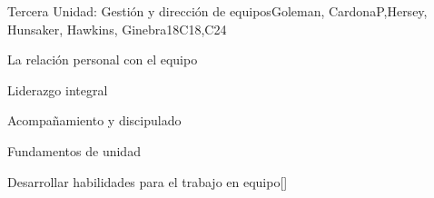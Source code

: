 \begin{syllabus}
\begin{unit}{}{Tercera Unidad: Gestión y dirección de equipos}{Goleman, CardonaP,Hersey, Hunsaker, Hawkins, Ginebra}{18}{C18,C24}
\begin{topics}
	\item La relación personal con el equipo
	\item Liderazgo integral
	\item Acompañamiento y discipulado
	\item Fundamentos de unidad
\end{topics}
\begin{learningoutcomes}
	\item Desarrollar habilidades para el trabajo en equipo[\Familiarity]
\end{learningoutcomes}
\end{unit}

\begin{coursebibliography}
\end{coursebibliography}

\end{syllabus}
